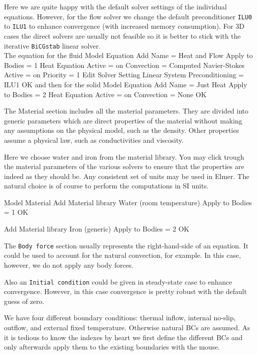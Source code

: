 Here we are quite happy with the default solver settings of the individual equations. 
However, for the flow solver we change the default preconditioner \texttt{ILU0} to \texttt{ILU1} to 
enhance convergence (with increased memory consumption). For 3D cases the direct solvers are usually 
not feasible so it is better to stick with the iterative \texttt{BiCGstab} linear solver. 
\\
The equation for the fluid
\ttbegin
Model
  Equation
    Add
    Name = Heat and Flow
    Apply to Bodies = 1
    Heat Equation
      Active = on
      Convection = Computed
    Navier-Stokes 
      Active = on
      Priority = 1
      Edit Solver Setting
        Linear System
          Preconditioning = ILU1
    OK
\ttend        
and then for the solid
\ttbegin
Model
  Equation
    Add
    Name = Just Heat
    Apply to Bodies = 2
    Heat Equation
      Active = on
      Convection = None
    OK
\ttend    


The Material section includes all the material parameters.
They are divided into generic parameters which are direct properties of the material
without making any assumptions on the physical model, such as the density. Other properties assume
a physical law, such as conductivities and viscosity. 

Here we choose water and iron from the material library.
You may click trough the material parameters of the various solvers to ensure that
the properties are indeed as they should be. Any consistent set of units may be used in Elmer.
The natural choice is of course to perform the computations in SI units. 

\ttbegin
Model
  Material
    Add
    Material library    
      Water (room temperature)
    Apply to Bodies = 1 
    OK

    Add
    Material library    
      Iron (generic)
    Apply to Bodies = 2
    OK
\ttend

The \texttt{Body force} section usually represents the right-hand-side of an equation. It could be used to account for the 
natural convection, for example. In this case, however, we do not apply any body forces.

Also an \texttt{Initial condition} could be given in steady-state case to enhance convergence. However, 
in this case convergence is pretty robust with the default guess of zero.

We have four different boundary conditions: thermal inflow, internal no-slip, 
outflow, and external fixed temperature. Otherwise natural BCs are assumed.
As it is tedious to know the indexes by heart we 
first define the different BCs and only afterwards apply them to the existing boundaries 
with the mouse. 

